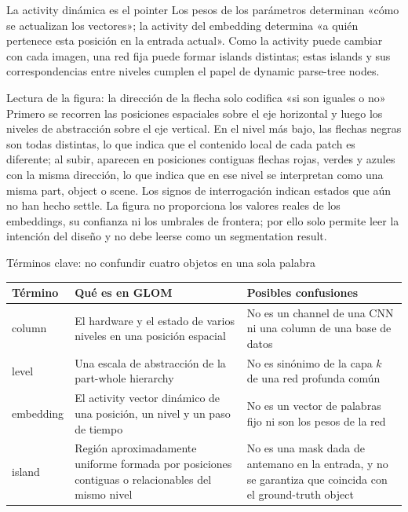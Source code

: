 \begin{importantbox}{La activity dinámica es el pointer}
Los pesos de los parámetros determinan «cómo se actualizan los vectores»; la activity del embedding determina «a quién pertenece esta posición en la entrada actual». Como la activity puede cambiar con cada imagen, una red fija puede formar islands distintas; estas islands y sus correspondencias entre niveles cumplen el papel de dynamic parse-tree nodes.
\end{importantbox}


\begin{knowledgebox}{Lectura de la figura: la dirección de la flecha solo codifica «si son iguales o no»}
Primero se recorren las posiciones espaciales sobre el eje horizontal y luego los niveles de abstracción sobre el eje vertical. En el nivel más bajo, las flechas negras son todas distintas, lo que indica que el contenido local de cada patch es diferente; al subir, aparecen en posiciones contiguas flechas rojas, verdes y azules con la misma dirección, lo que indica que en ese nivel se interpretan como una misma part, object o scene. Los signos de interrogación indican estados que aún no han hecho settle. La figura no proporciona los valores reales de los embeddings, su confianza ni los umbrales de frontera; por ello solo permite leer la intención del diseño y no debe leerse como un segmentation result.
\end{knowledgebox}

\begin{knowledgebox}{Términos clave: no confundir cuatro objetos en una sola palabra}
\begin{tabularx}{\textwidth}{L{0.21\textwidth}L{0.29\textwidth}X}
\toprule
Término & Qué es en GLOM & Posibles confusiones \\
\midrule
column & El hardware y el estado de varios niveles en una posición espacial & No es un channel de una CNN ni una column de una base de datos \\
level & Una escala de abstracción de la part-whole hierarchy & No es sinónimo de la capa $k$ de una red profunda común \\
embedding & El activity vector dinámico de una posición, un nivel y un paso de tiempo & No es un vector de palabras fijo ni son los pesos de la red \\
island & Región aproximadamente uniforme formada por posiciones contiguas o relacionables del mismo nivel & No es una mask dada de antemano en la entrada, y no se garantiza que coincida con el ground-truth object \\
\bottomrule
\end{tabularx}
\end{knowledgebox}

